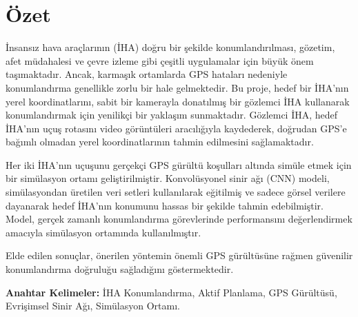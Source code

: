 \chapter*{Özet}


İnsansız hava araçlarının (İHA) doğru bir şekilde konumlandırılması, gözetim, afet müdahalesi ve çevre izleme gibi çeşitli uygulamalar için büyük önem taşımaktadır. Ancak, karmaşık ortamlarda GPS hataları nedeniyle konumlandırma genellikle zorlu bir hale gelmektedir. Bu proje, hedef bir İHA'nın yerel koordinatlarını, sabit bir kamerayla donatılmış bir gözlemci İHA kullanarak konumlandırmak için yenilikçi bir yaklaşım sunmaktadır. Gözlemci İHA, hedef İHA'nın uçuş rotasını video görüntüleri aracılığıyla kaydederek, doğrudan GPS'e bağımlı olmadan yerel koordinatlarının tahmin edilmesini sağlamaktadır.

Her iki İHA'nın uçuşunu gerçekçi GPS gürültü koşulları altında simüle etmek için bir simülasyon ortamı geliştirilmiştir. Konvolüsyonel sinir ağı (CNN) modeli, simülasyondan üretilen veri setleri kullanılarak eğitilmiş ve sadece görsel verilere dayanarak hedef İHA'nın konumunu hassas bir şekilde tahmin edebilmiştir. Model, gerçek zamanlı konumlandırma görevlerinde performansını değerlendirmek amacıyla simülasyon ortamında kullanılmıştır.

Elde edilen sonuçlar, önerilen yöntemin önemli GPS gürültüsüne rağmen güvenilir konumlandırma doğruluğu sağladığını göstermektedir. 

\vfill
\textbf{Anahtar Kelimeler:} İHA Konumlandırma, Aktif Planlama, GPS Gürültüsü, Evrişimsel Sinir Ağı, Simülasyon Ortamı.







\clearpage